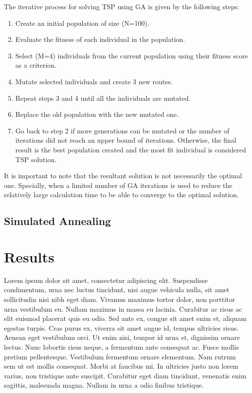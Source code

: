 \documentclass[twocolumn]{article}
\begin{document}
	The iterative process for solving TSP using GA is given by the following steps:
	\begin{enumerate}
		\item Create an initial population of size (N=100).
		\item Evaluate the fitness of each individual in the population.
		\item Select (M=4) individuals from the current population using their fitness score as a criterion.
		\item Mutate selected individuals and create 3 new routes.
		\item Repeat steps 3 and 4 until all the individuals are mutated.
		\item Replace the old population with the new mutated one.
		\item Go back to step 2 if more generations can be mutated or the number of iterations did not reach an upper bound of iterations. Otherwise, the final result is the best population created and the most fit individual is considered TSP solution.  
	\end{enumerate}
	It is important to note that the resultant solution is not necessarily the optimal one. Specially, when a limited number of GA iterations is used to reduce the relatively large calculation time to be able to converge to the optimal solution.
	
	\subsection{Simulated Annealing}
	 
	\section{Results}
	
	
	Lorem ipsum dolor sit amet, consectetur adipiscing elit. Suspendisse condimentum, urna nec luctus tincidunt, nisi augue vehicula nulla, sit amet sollicitudin nisi nibh eget diam. Vivamus maximus tortor dolor, non porttitor urna vestibulum eu. Nullam maximus in massa eu lacinia. Curabitur ac risus ac elit euismod placerat quis eu odio. Sed ante ex, congue sit amet enim et, aliquam egestas turpis. Cras purus ex, viverra sit amet augue id, tempus ultricies risus. Aenean eget vestibulum orci. Ut enim nisi, tempor id urna et, dignissim ornare lectus. Nunc lobortis risus neque, a fermentum ante consequat ac. Fusce mollis pretium pellentesque. Vestibulum fermentum ornare elementum. Nam rutrum sem ut est mollis consequat. Morbi at faucibus mi. In ultricies justo non lorem varius, non tristique ante suscipit. Curabitur eget diam tincidunt, venenatis enim sagittis, malesuada magna. Nullam in urna a odio finibus tristique.
	
\end{document}

